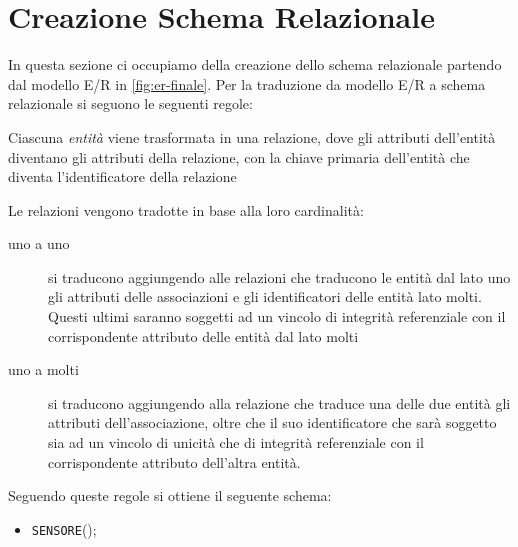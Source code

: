 \section{Creazione Schema Relazionale}
In questa sezione ci occupiamo della creazione dello schema relazionale partendo dal
modello E/R in \ref{fig:er-finale}. Per la traduzione da modello E/R a schema relazionale
si seguono le seguenti regole:
\begin{enumarate}
\item Ciascuna \textit{entità} viene trasformata in una relazione,
  dove gli attributi dell'entità diventano gli attributi della
  relazione, con la chiave primaria dell'entità che diventa
  l'identificatore della relazione
\item Le relazioni vengono tradotte in base alla loro cardinalità:
  \begin{description}
  \item[uno a uno] si traducono aggiungendo alle relazioni che traducono le entità dal lato uno gli
    attributi delle associazioni e gli identificatori delle entità lato molti. Questi ultimi saranno soggetti
    ad un vincolo di integrità referenziale con il corrispondente attributo delle entità dal lato molti
  \item[uno a molti] si traducono aggiungendo alla relazione che traduce una delle due entità gli attributi
    dell’associazione, oltre che il suo identificatore che sarà soggetto sia ad un vincolo di unicità
    che di integrità referenziale con il corrispondente attributo dell’altra entità.
  \end{description}
\end{enumarate}

Seguendo queste regole si ottiene il seguente schema:
\begin{itemize}
\item \texttt{SENSORE}();
\end{itemize}
